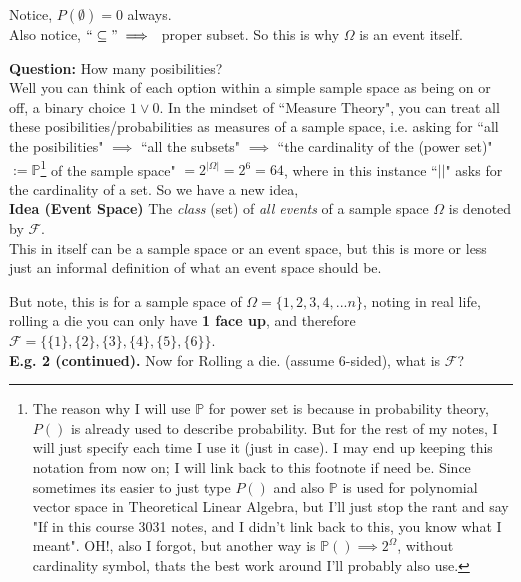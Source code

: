 \documentclass[12pt]{book}
\begin{document}
\noindent Notice, $P(\emptyset)=0$ always. \\
Also notice, $``\subseteq" \implies{}$ proper subset. So this is why $\Omega$ is an event itself.

\noindent \textbf{Question:} How many posibilities?\\
Well you can think of each option within a simple sample space as being on or off, a binary choice ${1 \lor 0}$. 
In the mindset of ``Measure Theory", you can treat all these posibilities/probabilities as measures of a sample space, i.e. asking for ``all the posibilities" $\implies{}$ ``all the subsets" $\implies{}$ 
``the cardinality of the (power set)"$:=\mathbb{P}$\footnote{The reason why I will use $\mathbb{P}$ for power set is because in probability theory, $P()$ is already used to describe probability. But for the rest of my notes, I will just specify each time I use it (just in case). I may end up keeping this notation from now on; I will link back to this footnote if need be. Since sometimes its easier to just type $P()$ and also $\mathbb{P}$ is used for polynomial vector space in Theoretical Linear Algebra, but I'll just stop the rant and say "If in this course 3031 notes, and I didn't link back to this, you know what I meant". OH!, also I forgot, but another way is $\mathbb{P}() \implies 2^{\Omega}$, without cardinality symbol, thats the best work around I'll probably also use.
} of the sample space" $=2^{|\Omega|}=2^6=64$, where in this instance ``$||$" asks for the cardinality of a set. 
So we have a new idea, \\

\noindent \textbf{Idea (Event Space)} The \textit{class} (set) of \textit{all events} of a sample space $\Omega$ is denoted by $\mathcal{F}$.\\

This in itself can be a sample space or an event space, but this is more or less just an informal definition of what an event space should be.

But note, this is for a sample space of $\Omega = \{ 1,2,3,4,...n \}$, noting in real life, rolling a die you can only have \textbf{1 face up}, and therefore $\mathcal{F}= \{ \{1\}, \{2\}, \{3\}, \{4\}, \{5\}, \{6\} \}$.\\

\noindent \textbf{E.g. 2 (continued).} Now for Rolling a die. (assume 6-sided), what is $\mathcal{F}$?
\end{document}
